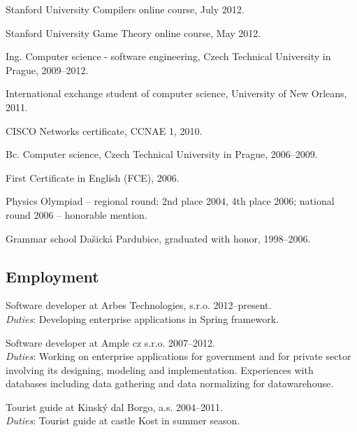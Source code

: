 \documentclass[czech]{article}
\renewenvironment{itemize}{
  \begin{list}{}{
    \setlength{\leftmargin}{1.5em}
  }
}{
  \end{list}
}
\begin{document}
\begin{itemize}
  \item Stanford University Compilers online course, July 2012.
  \item Stanford University Game Theory online course, May 2012.
	\item Ing. Computer science - software engineering, Czech Technical University
  in Prague, 2009--2012.

  \item International exchange student of computer science, University of New
  Orleans, 2011.
  \item CISCO Networks certificate, CCNAE 1, 2010.
  
  \item Bc. Computer science, Czech Technical University in Prague, 2006--2009.
  \item First Certificate in English (FCE), 2006.
  \item Physics Olympiad -- regional round: 2nd place 2004, 4th place 2006;
  national round 2006 -- honorable mention.
  \item Grammar school Dašická Pardubice, graduated with honor, 1998--2006.
\end{itemize}


\textcolor{coolblack}{\section*{Employment}}

\begin{itemize}
\item Software developer at Arbes Technologies, s.r.o. 2012--present.\\
\textit{Duties}: Developing enterprise applications in Spring framework.
\item Software developer at Ample cz s.r.o. 2007--2012.\\
\textit{Duties}: Working on enterprise applications for government and for
private sector involving its designing, modeling and implementation. Experiences
with databases including data gathering and data normalizing for datawarehouse.
\item Tourist guide at Kinský dal Borgo, a.s. 2004--2011.\\
\textit{Duties}: Tourist guide at castle Kost in summer season.
\end{itemize}
\end{document}
